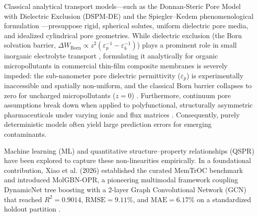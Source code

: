 \documentclass[10pt,twocolumn]{article}
\newcommand{\rsq}{R^{2}}
\begin{document}
Classical analytical transport models---such as the Donnan-Steric Pore Model with Dielectric Exclusion (DSPM-DE) \cite{bowen2002,bandini2003} and the Spiegler--Kedem phenomenological formulation \cite{spiegler1966,kedem1958}---presuppose rigid, spherical solutes, uniform dielectric pore media, and idealized cylindrical pore geometries. While dielectric exclusion (the Born solvation barrier, $\Delta W_{\mathrm{Born}} \propto z^2(\varepsilon_p^{-1} - \varepsilon_b^{-1})$) plays a prominent role in small inorganic electrolyte transport \cite{bandini2003}, formulating it analytically for organic micropollutants in commercial thin-film composite membranes is severely impeded: the sub-nanometer pore dielectric permittivity ($\varepsilon_p$) is experimentally inaccessible and spatially non-uniform, and the classical Born barrier collapses to zero for uncharged micropollutants ($z=0$) \cite{lin2022}. Furthermore, continuum pore assumptions break down when applied to polyfunctional, structurally asymmetric pharmaceuticals under varying ionic and flux matrices \cite{lin2022}. Consequently, purely deterministic models often yield large prediction errors for emerging contaminants.

Machine learning (ML) and quantitative structure--property relationships (QSPR) have been explored to capture these non-linearities empirically. In a foundational contribution, Xiao et al. (2026) established the curated MemTrOC benchmark and introduced MolGBN-OPR, a pioneering multimodal framework coupling DynamicNet tree boosting with a 2-layer Graph Convolutional Network (GCN) that reached $\rsq = 0.9014$, $\mathrm{RMSE} = 9.11\%$, and $\mathrm{MAE} = 6.17\%$ on a standardized holdout partition \cite{xiao2026}.
\end{document}
